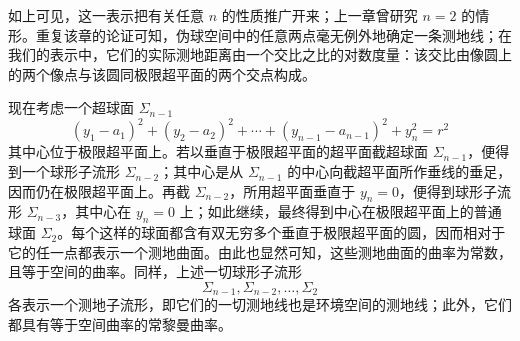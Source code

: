如上可见，这一表示把有关任意 $n$ 的性质推广开来；上一章曾研究 $n=2$ 的情形。重复该章的论证可知，伪球空间中的任意两点毫无例外地确定一条测地线；在我们的表示中，它们的实际测地距离由一个交比之比的对数度量：该交比由像圆上的两个像点与该圆同极限超平面的两个交点构成。

现在考虑一个超球面 $\Sigma_{n-1}$
\[
 (y_1-a_1)^2+(y_2-a_2)^2+\cdots+(y_{n-1}-a_{n-1})^2+y_n^2=r^2
\]
其中心位于极限超平面上。若以垂直于极限超平面的超平面截超球面 $\Sigma_{n-1}$，便得到一个球形子流形 $\Sigma_{n-2}$；其中心是从 $\Sigma_{n-1}$ 的中心向截超平面所作垂线的垂足，因而仍在极限超平面上。再截 $\Sigma_{n-2}$，所用超平面垂直于 $y_n=0$，便得到球形子流形 $\Sigma_{n-3}$，其中心在 $y_n=0$ 上；如此继续，最终得到中心在极限超平面上的普通球面 $\Sigma_2$。每个这样的球面都含有双无穷多个垂直于极限超平面的圆，因而相对于它的任一点都表示一个测地曲面。由此也显然可知，这些测地曲面的曲率为常数，且等于空间的曲率。同样，上述一切球形子流形
\[
 \Sigma_{n-1},\Sigma_{n-2},\ldots,\Sigma_2
\]
各表示一个测地子流形，即它们的一切测地线也是环境空间的测地线；此外，它们都具有等于空间曲率的常黎曼曲率。
